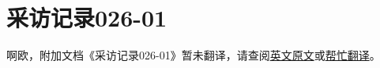 \renewcommand{\DOCNAME}{采访记录026-01}
\renewcommand{\DOCSLUG}{interview-log-026-01}

\chapter{
    \DOCNAME
}

\label{chap:DOC-\DOCSLUG}

啊欧，附加文档《\DOCNAME 》暂未翻译，请查阅\href{http://scp-wiki.wikidot.com/\DOCSLUG}{英文原文}或\href{http://scp-wiki-cn.wikidot.com/\DOCSLUG}{帮忙翻译}。
